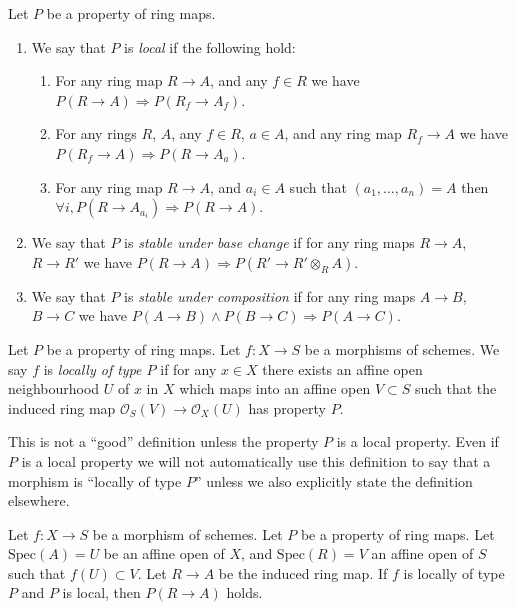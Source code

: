 \begin{definition}
\label{definition-property-local}
Let $P$ be a property of ring maps.
\begin{enumerate}
\item We say that $P$ is {\it local} if the following hold:
\begin{enumerate}
\item For any ring map $R \to A$, and any $f \in R$ we have
$P(R \to A) \Rightarrow P(R_f \to A_f)$.
\item For any rings $R$, $A$, any $f \in R$, $a\in A$, and any ring map
$R_f \to A$ we have $P(R_f \to A) \Rightarrow P(R \to A_a)$.
\item For any ring map $R \to A$, and $a_i \in A$ such that
$(a_1, \ldots, a_n) = A$ then
$\forall i, P(R \to A_{a_i}) \Rightarrow P(R \to A)$.
\end{enumerate}
\item We say that $P$ is {\it stable under base change} if for any
ring maps $R \to A$, $R \to R'$ we have
$P(R \to A) \Rightarrow P(R' \to R' \otimes_R A)$.
\item We say that $P$ is {\it stable under composition} if for any
ring maps $A \to B$, $B \to C$ we have
$P(A \to B) \wedge P(B \to C) \Rightarrow P(A \to C)$.
\end{enumerate}
\end{definition}

\begin{definition}
\label{definition-locally-P}
Let $P$ be a property of ring maps.
Let $f : X \to S$ be a morphisms of schemes.
We say $f$ is {\it locally of type $P$} if for any $x \in X$
there exists an affine open neighbourhood $U$ of $x$
in $X$ which maps into an affine open $V \subset S$ such that
the induced ring map $\mathcal{O}_S(V) \to \mathcal{O}_X(U)$
has property $P$.
\end{definition}

\noindent
This is not a ``good'' definition unless the property $P$ is
a local property. Even if $P$ is a local property we will not
automatically use this definition to say that a morphism is
``locally of type $P$'' unless we also explicitly state the
definition elsewhere.

\begin{lemma}
\label{lemma-locally-P}
Let $f : X \to S$ be a morphism of schemes.
Let $P$ be a property of ring maps.
Let $\text{Spec}(A) = U$ be an affine open of $X$,
and $\text{Spec}(R) = V$ an affine open of $S$ such that
$f(U) \subset V$. Let $R \to A$ be the induced ring map.
If $f$ is locally of type $P$ and $P$ is local,
then $P(R \to A)$ holds.
\end{lemma}

